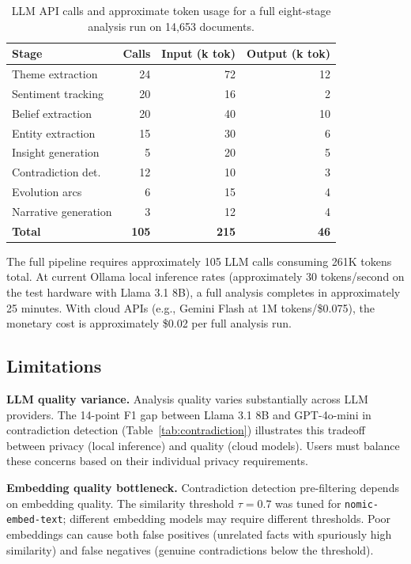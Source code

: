 \documentclass[manuscript,review]{acmart}
\begin{document}
\begin{table}[t]
\caption{LLM API calls and approximate token usage for a full eight-stage analysis run on 14,653 documents.}
\label{tab:llm-efficiency}
\small
\begin{tabular}{lrrr}
\toprule
\textbf{Stage} & \textbf{Calls} & \textbf{Input (k tok)} & \textbf{Output (k tok)} \\
\midrule
Theme extraction       & 24 & 72  & 12  \\
Sentiment tracking     & 20 & 16  & 2   \\
Belief extraction      & 20 & 40  & 10  \\
Entity extraction      & 15 & 30  & 6   \\
Insight generation     & 5  & 20  & 5   \\
Contradiction det.     & 12 & 10  & 3   \\
Evolution arcs         & 6  & 15  & 4   \\
Narrative generation   & 3  & 12  & 4   \\
\midrule
\textbf{Total}         & \textbf{105} & \textbf{215} & \textbf{46} \\
\bottomrule
\end{tabular}
\end{table}

The full pipeline requires approximately 105 LLM calls consuming 261K tokens total.
At current Ollama local inference rates (approximately 30 tokens/second on the test hardware with Llama 3.1 8B), a full analysis completes in approximately 25 minutes.
With cloud APIs (e.g., Gemini Flash at 1M tokens/\$0.075), the monetary cost is approximately \$0.02 per full analysis run.

\subsection{Limitations}
\label{sec:limitations}

\textbf{LLM quality variance.}
Analysis quality varies substantially across LLM providers.
The 14-point F1 gap between Llama 3.1 8B and GPT-4o-mini in contradiction detection (Table~\ref{tab:contradiction}) illustrates this tradeoff between privacy (local inference) and quality (cloud models).
Users must balance these concerns based on their individual privacy requirements.

\textbf{Embedding quality bottleneck.}
Contradiction detection pre-filtering depends on embedding quality.
The similarity threshold $\tau = 0.7$ was tuned for \texttt{nomic-embed-text}; different embedding models may require different thresholds.
Poor embeddings can cause both false positives (unrelated facts with spuriously high similarity) and false negatives (genuine contradictions below the threshold).
\end{document}
